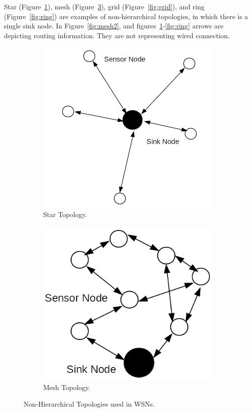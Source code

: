 \documentclass[12pt, oneandhalf, chaparabic, sees, ms]{metu}
\begin{document}
Star (Figure~\ref{fig:star}), mesh (Figure~\ref{fig:mesh}),
grid (Figure~\ref{fig:grid}), and  ring (Figure~\ref{fig:ring}) are examples of non-hierarchical topologies, 
in which there is a single sink node. 
In Figure~\ref{fig:mesh2}, and figures~\ref{fig:star}-\ref{fig:ring} arrows are depicting routing information. They are not representing wired connection.
% 
%
% 
\begin{figure}[!htbp]
  \begin{subfigure}[b]{0.45\textwidth}
    \includegraphics[width=\textwidth]{star.png}
    \caption{Star Topology.}
    \label{fig:star}
  \end{subfigure}
  \hfill
  \begin{subfigure}[b]{0.45\textwidth}
    \includegraphics[width=\textwidth]{mesh.png}
    \caption{Mesh Topology.}
    \label{fig:mesh}
  \end{subfigure}
   
  \caption{Non-Hierarchical Topologies used in WSNs.}
\end{figure}
% 
%
% 
\end{document}
